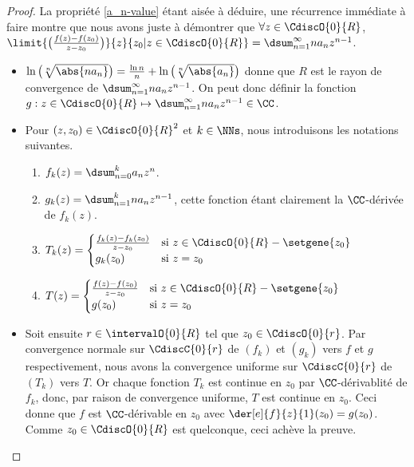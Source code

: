 \begin{proof}
	La propriété \ref{a_n-value} étant aisée à déduire, une récurrence immédiate à faire montre que nous avons juste à démontrer que
	$\forall z \in \CdiscO{0}{R}$,
	$ \limit{\big( \frac{f(z) - f(z_0)}{z - z_0} \big)}%
	        {z}{z_0 | z \in \CdiscO{0}{R}}
	= \dsum_{n = 1}^{\infty} n a_n z^{n - 1}$.
	\begin{itemize}
		\item
		$ \ln \big( \sqrt[n]{\abs{n a_n}} \big)
		= \frac{\ln n}{n} + \ln \big( \sqrt[n]{\abs{a_n}} \big)$
		donne que
		$R$ est le rayon de convergence de
		$\dsum_{n = 1}^{\infty} n a_n z^{n - 1}$.
		On peut donc définir la fonction $g: z \in \CdiscO{0}{R} \mapsto \dsum_{n = 1}^{\infty} n a_n z^{n - 1} \in \CC$.


		\item Pour $(z , z_0) \in \CdiscO{0}{R}^2$ et $k \in \NNs$, nous introduisons les notations suivantes.
        \begin{enumerate}[label=(\alph*)]
	        \item $f_k(z) = \dsum_{n = 0}^{k} a_n z^n$.

	        \item $g_k(z) = \dsum_{n = 1}^{k} n a_n z^{n-1}$,
	        cette fonction étant clairement la $\CC$-dérivée de $f_k(z)$.

	        \item $T_k(z) =
			\begin{cases}
	    		\frac{f_k(z) - f_k(z_0)}{z - z_0}  & \text{si $z \in \CdiscO{0}{R} - \setgene{z_0}$} \\
	   			g_k(z_0)                           & \text{si $z = z_0$}
	 		\end{cases}$

	        \item $T(z) =
			\begin{cases}
	    		\frac{f(z) - f(z_0)}{z - z_0}  & \text{si $z \in \CdiscO{0}{R} - \setgene{z_0}$} \\
	   			g(z_0)                         & \text{si $z = z_0$}
	 		\end{cases}$
	    \end{enumerate}


		\item Soit ensuite $r \in \intervalO{0}{R}$ tel que $z_0 \in \CdiscO{0}{r}$.
		Par convergence normale sur $\CdiscC{0}{r}$ de $(f_k)$ et $(g_k)$ vers $f$ et $g$ respectivement,
		nous avons la convergence uniforme sur $\CdiscC{0}{r}$ de $(T_k)$ vers $T$. 
		Or chaque fonction $T_k$ est continue en $z_0$ par $\CC$-dérivablité de $f_k$, donc, par raison de convergence uniforme, $T$ est continue en $z_0$. Ceci donne que $f$ est $\CC$-dérivable en $z_0$ avec $\der[e]{f}{z}{1}(z_0) = g(z_0)$.
		Comme $z_0 \in \CdiscO{0}{R}$ est quelconque, ceci achève la preuve.
	\end{itemize}
\end{proof}


